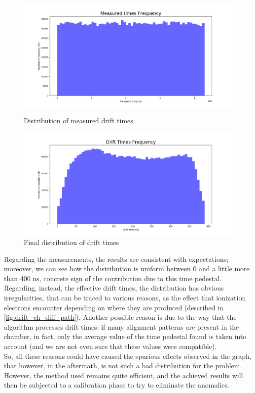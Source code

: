 \documentclass[a4paper,11pt]{book}
\begin{document}
\begin{figure}[hbtp]
\begin{minipage}[c]{0.5\textwidth}
\centering
\includegraphics[scale=0.25]{pictures/Measured_times_Frequency.pdf}
\caption{Distribution of measured drift times}
\label{fig:TIME_NS}
\end{minipage}  
\begin{minipage}[c]{0.5\textwidth}
\centering
\includegraphics[scale=0.25]{pictures/Drift_Times_Frequency.pdf}
\caption{Final distribution of drift times}
\label{fig:DRIFT_TIMES}
\end{minipage}
\end{figure}

Regarding the measurements, the results are consistent with expectations; moreover, we can see how the distribution is uniform between 0 and a little more than 400 ns, concrete sign of the contribution due to this time pedestal. Regarding, instead, the effective drift times, the distribution has obvious irregularities, that can be traced to various reasons, as the effect that ionization electrons encounter depending on where they are produced (described in \ref{fig:drift_ch_diff_path}). Another possible reason is due to the way that the algorithm processes drift times: if many alignment patterns are present in the chamber, in fact, only the average value of the time pedestal found is taken into account (and we are not even sure that these values were compatible).\\
So, all these reasons could have caused the spurious effects observed in the graph, that however, in the aftermath, is not such a bad distribution for the problem.\\
However, the method used remains quite efficient, and the achieved results will then be subjected to a calibration phase to try to eliminate the anomalies.\\
\end{document}
